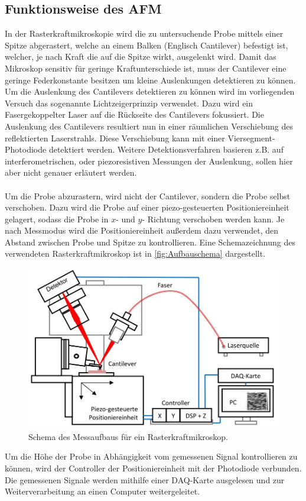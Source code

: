 \subsection{Funktionsweise des AFM}
\label{subsec:afmfunk}
In der Rasterkraftmikroskopie wird die zu untersuchende Probe mittels einer Spitze abgerastert, welche an einem Balken (Englisch Cantilever) befestigt ist, welcher, je nach Kraft die auf die Spitze wirkt, ausgelenkt wird.
Damit das Mikroskop sensitiv für geringe Kraftunterschiede ist, muss der Cantilever eine geringe Federkonstante besitzen um kleine Auslenkungen detektieren zu können. Um die Auslenkung des Cantilevers detektieren zu können wird im vorliegenden Versuch das sogenannte Lichtzeigerprinzip verwendet. Dazu wird ein Fasergekoppelter Laser auf die Rückseite des Cantilevers fokussiert. Die Auslenkung des Cantilevers resultiert nun in einer räumlichen Verschiebung des reflektierten Laserstrahls. Diese Verschiebung kann mit einer Viersegment-Photodiode detektiert werden. Weitere Detektionsverfahren basieren z.B. auf interferometrischen, oder piezoresistiven Messungen der Auslenkung, sollen hier aber nicht genauer erläutert werden.\\
\\
Um die Probe abzurastern, wird nicht der Cantilever, sondern die Probe selbst verschoben. Dazu wird die Probe auf einer piezo-gesteuerten Positioniereinheit gelagert, sodass die Probe in $x$- und $y$- Richtung verschoben werden kann. Je nach Messmodus wird die Positioniereinheit außerdem dazu verwendet, den Abstand zwischen Probe und Spitze zu kontrollieren. Eine Schemazeichnung des verwendeten Rasterkraftmikroskop ist in \autoref{fig:Aufbauschema} dargestellt.
\begin{figure}[H]
\centering
  \includegraphics[width=\textwidth]{content/plots/Aufbau.jpg}
  \caption{Schema des Messaufbaus für ein Rasterkraftmikroskop.}
  \label{fig:Aufbauschema}
\end{figure}
Um die Höhe der Probe in Abhängigkeit vom gemessenen Signal kontrollieren zu können, wird der Controller
der Positioniereinheit mit der Photodiode verbunden. Die gemessenen Signale werden mithilfe einer DAQ-Karte ausgelesen und zur Weiterverarbeitung an einen Computer weitergeleitet.

